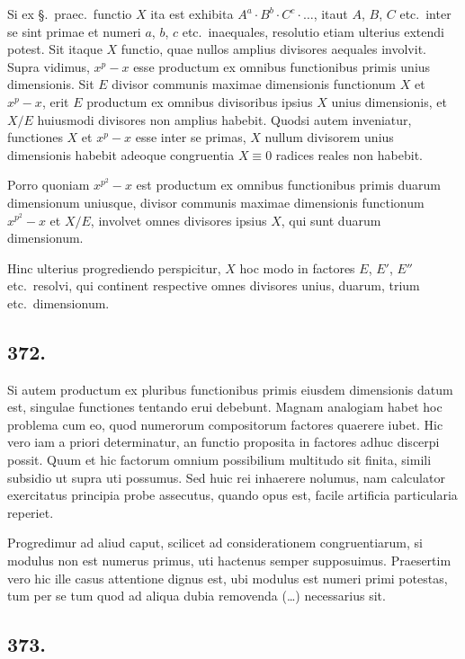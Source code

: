 \documentclass[12pt]{article}
\begin{document}
Si ex \S.~praec.~functio $X$ ita est exhibita $A^a\cdot B^b\cdot C^c\cdot\ldots$, itaut $A$, $B$, $C$ etc.~inter se sint primae et numeri $a$, $b$, $c$ etc.~inaequales, resolutio etiam ulterius extendi potest. Sit itaque $X$ functio, quae nullos amplius divisores aequales involvit. Supra vidimus, $x^p-x$ esse productum ex omnibus functionibus primis unius dimensionis. Sit $E$ divisor communis maximae dimensionis functionum $X$ et $x^p-x$, erit $E$ productum ex omnibus divisoribus ipsius $X$ unius dimensionis, et $X/E$ huiusmodi divisores non amplius habebit. Quodsi autem inveniatur, functiones $X$ et $x^p-x$ esse inter se primas, $X$ nullum divisorem unius dimensionis habebit adeoque congruentia $X\equiv 0$ radices reales non habebit.

Porro quoniam $x^{p^2}-x$ est productum ex omnibus functionibus primis duarum dimensionum uniusque, divisor communis maximae dimensionis functionum $x^{p^2}-x$ et $X/E$, involvet omnes divisores ipsius $X$, qui sunt duarum dimensionum.

Hinc ulterius progrediendo perspicitur, $X$ hoc modo in factores $E$, $E'$, $E''$ etc.~resolvi, qui continent respective omnes divisores unius, duarum, trium etc.~dimensionum.

\subsection*{372.}

Si autem productum ex pluribus functionibus primis eiusdem dimensionis datum est, singulae functiones tentando erui debebunt. Magnam analogiam habet hoc problema cum eo, quod numerorum compositorum factores quaerere iubet. Hic vero iam a priori determinatur, an functio proposita in factores adhuc discerpi possit. Quum et hic factorum omnium possibilium multitudo sit finita, simili subsidio ut supra uti possumus. Sed huic rei inhaerere nolumus, nam calculator exercitatus principia probe assecutus, quando opus est, facile artificia particularia reperiet.

Progredimur ad aliud caput, scilicet ad considerationem congruentiarum, si modulus non est numerus primus, uti hactenus semper supposuimus. Praesertim vero hic ille casus attentione dignus est, ubi modulus est numeri primi potestas, tum per se tum quod ad aliqua dubia removenda (\ldots) necessarius sit.

\subsection*{373.}
\end{document}
